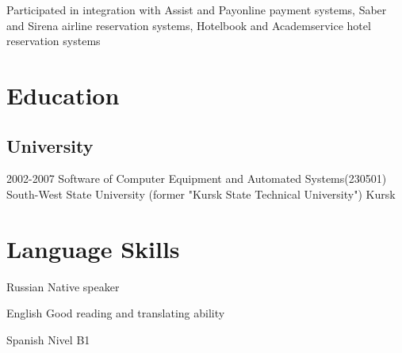 \documentclass[11pt,a4paper,sans]{moderncv}
\newcommand{\lang}[2]{#2}
\begin{document}
										
		\cvlistitem
		{\lang
			{Занимался интеграцией с платёжными системами Assist и Payonline, системами бронирования авиабилетов Sabre и Sirena, системами бронирования отелей Hotelbook и Академсервис}
			{Participated in integration with {\textquotedbl}Assist{\textquotedbl} and {\textquotedbl}Payonline{\textquotedbl} payment systems, {\textquotedbl}Saber{\textquotedbl} and {\textquotedbl}Sirena{\textquotedbl} airline reservation systems, {\textquotedbl}Hotelbook{\textquotedbl} and {\textquotedbl}Academservice{\textquotedbl} hotel reservation systems}\\}
															
															
			\section
			{\lang
				{Образование}
				{Education}}
															
			\subsection
			{\lang
				{Высшее образование}
				{University}}
															
			\cventry
			{2002-2007}
			{\lang
				{Инженер по специальности «Программное обеспечение вычислительной техники и автоматизированных систем»}
				{Software of Computer Equipment and Automated Systems(230501)}}
			{\lang
				{«Юго-Западный государственный университет» (бывший «Курский государственный технический университет»)}
				{South-West State University (former "Kursk State Technical University")}}
			{\lang
				{Курск}
				{Kursk}}
			{}
			{}
															
			\section
			{\lang
				{Языки}
				{Language Skills}}
															
			\cvlanguage
			{\lang
				{Русский}
				{Russian}}
			{\lang
				{родной язык}
				{Native speaker}}
			{}
															
			\cvlanguage
			{\lang
				{Английский}
				{English}}
			{\lang
				{технический, разговорный}
				{Good reading and translating ability}}
			{}
															
			\cvlanguage
			{\lang
				{Испанский}
				{Spanish}}
			{\lang
				{уровень B1}
				{Nivel B1}}
			{}
															
\end{document}
